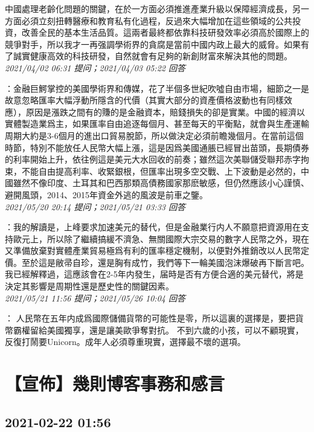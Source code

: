 \documentclass[twocolumn]{ctexart}
\begin{document}
中國處理老齡化問題的關鍵，在於一方面必須推進產業升級以保障經濟成長，另一方面必須立刻扭轉醫療和教育私有化過程，反過來大幅增加在這些領域的公共投資，改善全民的基本生活品質。這兩者最終都依靠科技研發效率必須高於國際上的競爭對手，所以我才一再强調學術界的貪腐是當前中國内政上最大的威脅。如果有了誠實健康高效的科技研發，自然就會有足夠的新創財富來解決其他的問題。
\\

\textit{\hfill\noindent\small 2021/04/02 06:31 提问；2021/04/03 05:22 回答}

：金融巨鰐掌控的美國學術界和傳媒，花了半個多世紀吹噓自由市場，細節之一是故意忽略匯率大幅浮動所隱含的代價（其實大部分的資產價格波動也有同樣效應），原因是漲跌之間有的賺的是金融資本，賠錢損失的卻是實業。中國的經濟以實體製造業爲主，如果匯率自由追逐每個月、甚至每天的平衡點，就會與生產運輸周期大約是3-6個月的進出口貿易脫節，所以做決定必須前瞻幾個月。在當前這個時節，特別不能放任人民幣大幅上漲，這是因爲美國通脹已經冒出苗頭，長期債券的利率開始上升，依往例這是美元大水回收的前奏；雖然這次美聯儲受聯邦赤字拘束，不能自由提高利率、收緊銀根，但匯率出現多空交戰、上下波動是必然的，中國雖然不像印度、土耳其和巴西那類高債務國家那麽敏感，但仍然應該小心謹慎、避開風頭，2014、2015年資金外逃的風波是前車之鑒。
\\

\textit{\hfill\noindent\small 2021/05/20 20:14 提问；2021/05/21 03:33 回答}

：我的解讀是，上峰要求加速美元的替代，但是金融業行内人不願意把資源用在支持歐元上，所以除了繼續搞緩不濟急、無關國際大宗交易的數字人民幣之外，現在又準備放棄對實體產業貿易極爲有利的匯率穩定機制，以便對外推銷改以人民幣定價。至於這是敝帚自珍，還是胸有成竹，我們等下一輪美國泡沫爆破再下斷言吧。我已經解釋過，這應該會在2-5年内發生，届時是否有方便合適的美元替代，將是決定其影響是周期性還是歷史性的關鍵因素。
\\

\textit{\hfill\noindent\small 2021/05/21 11:56 提问；2021/05/26 10:04 回答}

：
人民幣在五年内成爲國際儲備貨幣的可能性是零，所以這裏的選擇是，要把貨幣霸權留給美國獨享，還是讓美歐爭奪對抗。
不到六歲的小孩，可以不顧現實，反復打鬧要Unicorn。成年人必須尊重現實，選擇最不壞的選項。
\\


\section{【宣佈】幾則博客事務和感言}
\subsection{2021-02-22 01:56}
\end{document}
